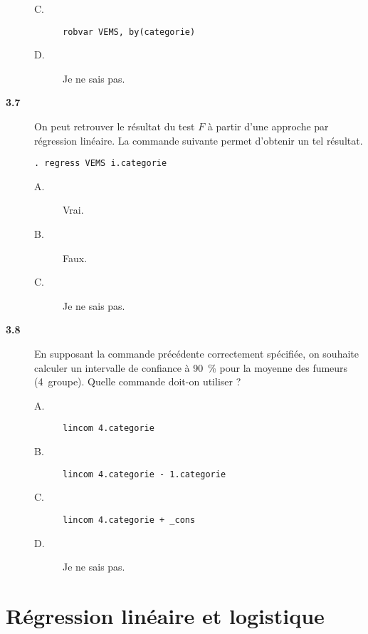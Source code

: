 \begin{description}
\begin{description}
\item[C.] \verb|robvar VEMS, by(categorie)|
\item[D.] Je ne sais pas.
\end{description}
\item[\bf 3.7] On peut retrouver le résultat du test $F$ à partir d'une
  approche par régression linéaire. La commande suivante permet d'obtenir un
  tel résultat. 
\begin{verbatim}
. regress VEMS i.categorie
\end{verbatim}
\begin{description}
\item[A.] Vrai.
\item[B.] Faux.
\item[C.] Je ne sais pas.
\end{description}
\item[\bf 3.8] En supposant la commande précédente correctement spécifiée,
  on souhaite calculer un intervalle de confiance à 90~\% pour la moyenne
  des fumeurs (4\ieme\ groupe). Quelle commande doit-on utiliser ?
\begin{description}
\item[A.] \verb|lincom 4.categorie|
\item[B.] \verb|lincom 4.categorie - 1.categorie|
\item[C.] \verb|lincom 4.categorie + _cons|
\item[D.] Je ne sais pas.
\end{description}
\end{description}

\chapter{Régression linéaire et logistique}

